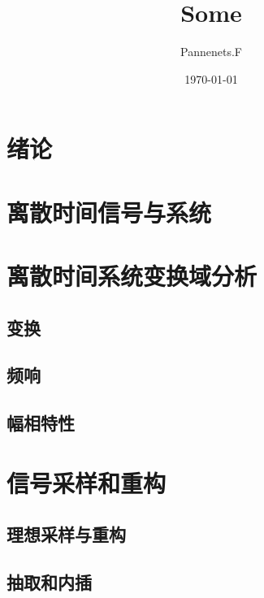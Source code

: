\documentclass[en,11pt,english,black,simple,device=ppt]{elegantbook}
\title{Some}
\author{Pannenets.F}
\date{\today}
\begin{document}
\maketitle
\frontmatter


\mainmatter

\chapter{绪论}



\chapter{离散时间信号与系统}



\chapter{离散时间系统变换域分析}

\section{变换}



\section{频响}



\section{幅相特性}



\chapter{信号采样和重构}

\section{理想采样与重构}



\section{抽取和内插}
\end{document}
